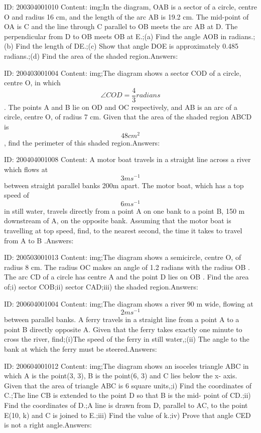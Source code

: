\documentclass{article}
\begin{document}
ID: 200304001010
Content:
img;In the diagram, OAB is a sector of a circle, centre O and radius 16 cm, and the length of the arc AB is 19.2 cm. The mid-point of OA is C and the line through C parallel to OB meets the arc AB at D. The perpendicular from D to OB meets OB at E.;(a)	Find the angle AOB in radians.;(b)	Find the length of DE.;(c)	Show that angle DOE is approximately 0.485 radians.;(d)	Find the area of the shaded region.Answers:

ID: 200403001004
Content:
img;The diagram shows a sector COD of a circle, centre O, in which $$\angle COD= \frac{4}{3} radians$$. The points A and B lie on OD and OC respectively, and AB is an arc of a circle, centre O, of radius 7 cm. Given that the area of the shaded region ABCD is $$48cm^2$$, find the perimeter of this shaded region.Answers:

ID: 200404001008
Content:
A motor boat travels in a straight line across a river which flows at \[3ms^{-1}\] between straight parallel banks 200m apart. The motor boat, which has a top speed of \[6 ms^{-1}\] in still water, travels directly from a point A on one bank to a point B, 150 m downstream of A, on the opposite bank. Assuming that the motor boat is travelling at top speed, find, to the nearest second, the time it takes to travel from A to B .Answers:

ID: 200503001013
Content:
img;The diagram shows a semicircle, centre O, of radius 8 cm. The radius OC makes an angle of 1.2 radians with the radius OB . The arc CD of a circle has centre A and the point D lies on OB . Find the area of;i)	sector COB;ii)	sector CAD;iii)	the shaded region.Answers:

ID: 200604001004
Content:
img;The diagram shows a river 90 m wide, flowing at $$2ms^{-1}$$ between parallel banks. A ferry travels in a straight line from a point A to a point B directly opposite A. Given that the ferry takes exactly one minute to cross the river, find;(i)The speed of the ferry in still water,;(ii)	The angle to the bank at which the ferry must be steered.Answers:

ID: 200604001012
Content:
img;The diagram shows an isoceles triangle ABC in which A is the point(3, 3), B is the point(6, 3) and C lies below the x- axis. Given that the area of triangle ABC is 6 square units,;i) Find the coordinates of C.;The line CB is extended to the point D so that B is the mid- point of CD.;ii) Find the coordinates of D.;A line is drawn from D, parallel to AC, to the point E(10, k) and C is joined to E.;iii) Find the value of k.;iv) Prove that angle CED is not a right angle.Answers:
\end{document}

